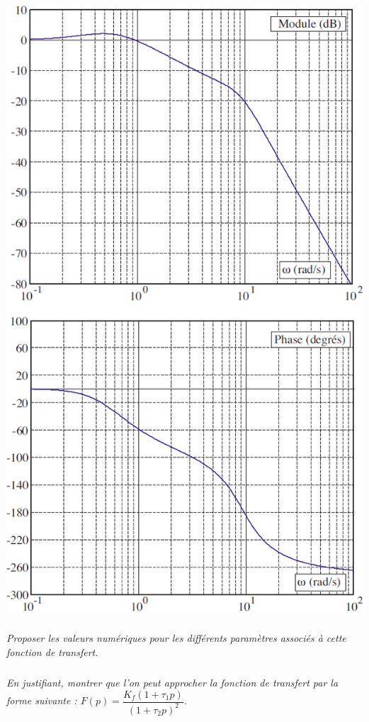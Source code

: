 \documentclass[10pt,fleqn]{article} %
\begin{document}
\begin{multicols}{2}
\begin{center}
\includegraphics[width=\linewidth]{images/fig_04}
\end{center}


\subparagraph{}\textit{Proposer les valeurs numériques pour les différents paramètres associés à
cette fonction de transfert.}

\subparagraph{}\textit{En justifiant, montrer que l’on peut approcher la fonction de
transfert par la forme suivante : $F(p)=\dfrac{K_f \left(1
+\tau_1 p \right)}{\left(1
+\tau_2 p \right)^2}$.}


\end{multicols}
\end{document}
